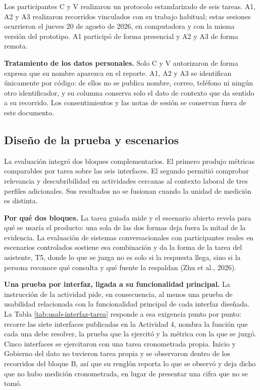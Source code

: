 Los participantes C y V realizaron un protocolo estandarizado de seis tareas. A1, A2 y A3
realizaron recorridos vinculados con su trabajo habitual; estas sesiones ocurrieron el jueves 20
de agosto de 2026, en computadora y con la misma versión del prototipo. A1 participó de forma
presencial y A2 y A3 de forma remota.

\textbf{Tratamiento de los datos personales.} Solo C y V autorizaron de forma expresa que su
nombre aparezca en el reporte. A1, A2 y A3 se identifican únicamente por código: de ellos no se
publica nombre, correo, teléfono ni ningún otro identificador, y su columna conserva solo el dato
de contexto que da sentido a su recorrido. Los consentimientos y las notas de sesión se conservan
fuera de este documento.

\subsection{Diseño de la prueba y escenarios}\label{subsec:usab-diseno}

La evaluación integró dos bloques complementarios. El primero produjo métricas comparables por
tarea sobre las seis interfaces. El segundo permitió comprobar relevancia y descubribilidad en
actividades cercanas al contexto laboral de tres perfiles adicionales. Sus resultados no se
fusionan cuando la unidad de medición es distinta.

\textbf{Por qué dos bloques.} La tarea guiada mide y el escenario abierto revela para qué se
usaría el producto: una sola de las dos formas deja fuera la mitad de la evidencia. La evaluación
de sistemas conversacionales con participantes reales en escenarios controlados sostiene esa
combinación y da la forma de la tarea del asistente, T5, donde lo que se juzga no es solo si la
respuesta llega, sino si la persona reconoce qué consulta y qué fuente la respaldan
(Zhu et al., 2026).

\textbf{Una prueba por interfaz, ligada a su funcionalidad principal.} La instrucción de la
actividad pide, en consecuencia, al menos una prueba de usabilidad relacionada con la
funcionalidad principal de cada interfaz diseñada. La Tabla \ref{tab:usab-interfaz-tarea} responde
a esa exigencia punto por punto: recorre las siete interfaces publicadas en la Actividad 4, nombra
la función que cada una debe resolver, la prueba que la ejercitó y la métrica con la que se juzgó.
Cinco interfaces se ejercitaron con una tarea cronometrada propia. Inicio y Gobierno del dato no
tuvieron tarea propia y se observaron dentro de los recorridos del bloque B, así que su renglón
reporta lo que se observó y deja dicho que no hubo medición cronometrada, en lugar de presentar
una cifra que no se tomó.

